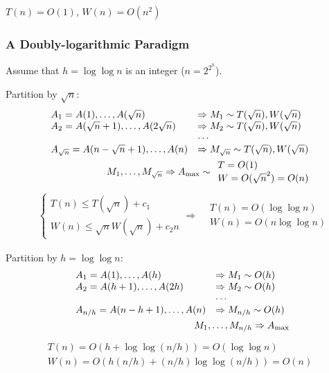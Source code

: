 $T(n)=O(1)$, $W(n)=O(n^2)$

\subsubsection{A Doubly-logarithmic Paradigm}
Assume that $h = \log \log n$ is an integer ($\displaystyle n=2^{2^h}$).

Partition by $\sqrt{n}$:{\small
\begin{align*}
    \begin{array}[pos]{ll}
        A_1=A(1),\dots,A(\sqrt{n})&\Rightarrow M_1 \sim T(\sqrt{n}), W(\sqrt{n})\\
        A_2=A(\sqrt{n}+1),\dots,A(2\sqrt{n})&\Rightarrow M_2 \sim T(\sqrt{n}), W(\sqrt{n})\\
        &\cdots \\
        A_{\sqrt{n}}=A(n-\sqrt{n}+1),\dots,A(n)&\Rightarrow M_{\sqrt{n}} \sim T(\sqrt{n}), W(\sqrt{n})
    \end{array}\\
    M_1,\dots,M_{\sqrt{n}}\Rightarrow A_{\max}\sim \begin{array}{l}
        T=O(1)\\
        W=O(\sqrt{n}^2)=O(n)
    \end{array}
\end{align*}}
\begin{align*}
    &\left\{\begin{array}{l}
        T(n)\le T(\sqrt{n})+c_1\\
        W(n)\le \sqrt{n}W(\sqrt{n})+c_2 n
    \end{array}\right.
    \Rightarrow&\begin{array}{l}
        T(n)=O(\log \log n)\\
        W(n)=O(n \log \log n)
    \end{array}
\end{align*}

Partition by $h = \log \log n$:{\small
\begin{align*}
    \begin{array}[pos]{ll}
        A_1=A(1),\dots,A(h)&\Rightarrow M_1 \sim  O(h)\\
        A_2=A(h+1),\dots,A(2h)&\Rightarrow M_2 \sim O(h)\\
        &\cdots \\
        A_{n/h}=A(n-h+1),\dots,A(n)&\Rightarrow M_{n/h} \sim O(h)
    \end{array}\\
    M_1,\dots,M_{n/h}\Rightarrow A_{\max}
\end{align*}}
\begin{align*}
    \begin{array}{l}
        T(n)=O(h+\log \log (n/h))=O(\log \log n)\\
        W(n)=O(h(n/h)+(n/h)\log\log(n/h))=O(n)
    \end{array}
\end{align*}

